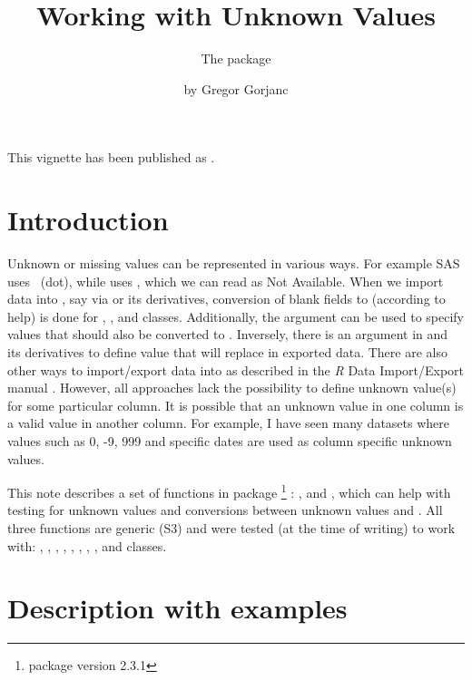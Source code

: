 \documentclass[a4paper]{report}
\begin{document}
\begin{article}

\title{Working with Unknown Values}
\subtitle{The  package}
\author{by Gregor Gorjanc}

\maketitle

This vignette has been published as \cite{Gorjanc}.

\section{Introduction}

Unknown or missing values can be represented in various ways. For example
SAS uses ~(dot), while \R{} uses , which we can read as
Not Available. When we import data into \R{}, say via  or
its derivatives, conversion of blank fields to  (according to
 help) is done for , ,
 and  classes. Additionally,
the 
argument can be used to specify values that should also be converted to
. Inversely, there is an argument  in 
and its derivatives to define value that will replace  in exported
data. There are also other ways to import/export data into \R{} as
described in the {\emph R Data Import/Export} manual \citep{RImportExportManual}.
However, all approaches lack the possibility to define unknown value(s) for
some particular column. It is possible that an unknown value in one column is a
valid value in another column. For example, I have seen many datasets where
values such as 0, -9, 999 and specific dates are used as column specific unknown
values.

This note describes a set of functions in package \footnote{
package version 2.3.1} \citep{WarnesGdata}: ,
 and , which can help with testing for
unknown values and conversions between unknown values and . All
three functions are generic (S3) and were tested (at the time of writing)
to work with: , , ,
, , , , ,
 and  classes.

\section{Description with examples}


\end{article}
\end{document}

